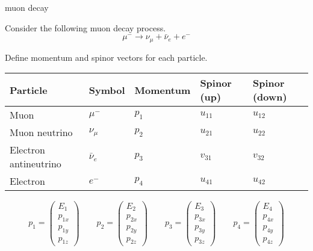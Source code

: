 \documentclass[12pt]{article}
\begin{document}
\begin{center}
{\sc muon decay}
\end{center}

\noindent
Consider the following muon decay process.
$$
\mu^-\rightarrow\nu_\mu+\bar{\nu}_e+e^-
$$

\noindent
Define momentum and spinor vectors for each particle.

\bigskip
\begin{center}
\begin{tabular}{|l|l|l|l|l|}
\hline
Particle & Symbol & Momentum & Spinor (up) & Spinor (down)\\
\hline
Muon & $\mu^-$ & $p_1$ & $u_{11}$ & $u_{12}$\\
Muon neutrino & $\nu_\mu$ & $p_2$ & $u_{21}$ & $u_{22}$\\
Electron antineutrino & $\bar{\nu}_e$ & $p_3$ & $v_{31}$ & $v_{32}$\\
Electron & $e^-$ & $p_4$ & $u_{41}$ & $u_{42}$\\
\hline
\end{tabular}
\end{center}
%
$$
p_1=\begin{pmatrix}E_1\\p_{1x}\\p_{1y}\\p_{1z}\end{pmatrix}\qquad
p_2=\begin{pmatrix}E_2\\p_{2x}\\p_{2y}\\p_{2z}\end{pmatrix}\qquad
p_3=\begin{pmatrix}E_3\\p_{3x}\\p_{3y}\\p_{3z}\end{pmatrix}\qquad
p_4=\begin{pmatrix}E_4\\p_{4x}\\p_{4y}\\p_{4z}\end{pmatrix}
$$
%
\end{document}
